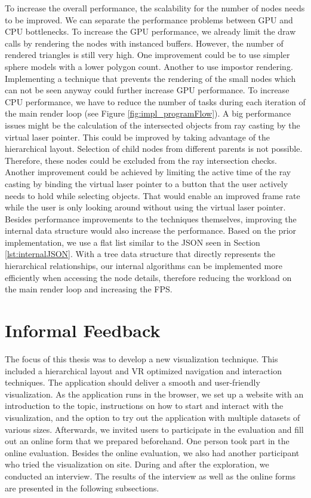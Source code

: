 To increase the overall performance, the scalability for the number of nodes needs to be improved. We can separate the performance problems between GPU and CPU bottlenecks.
To increase the GPU performance, we already limit the draw calls by rendering the nodes with instanced buffers.
However, the number of rendered triangles is still very high. 
One improvement could be to use simpler sphere models with a lower polygon count. Another to use impostor rendering. Implementing a technique that prevents the rendering of the small nodes which can not be seen anyway could further increase GPU performance.
To increase CPU performance, we have to reduce the number of tasks during each iteration of the main render loop (see Figure \ref{fig:impl_programFlow}).
A big performance issues might be the calculation of the intersected objects from ray casting by the virtual laser pointer. This could be improved by taking advantage of the hierarchical layout.
Selection of child nodes from different parents is not possible. Therefore, these nodes could be excluded from the ray intersection checks. 
Another improvement could be achieved by limiting the active time of the ray casting by binding the virtual laser pointer to a button that the user actively needs to hold while selecting objects. 
That would enable an improved frame rate while the user is only looking around without using the virtual laser pointer.
Besides performance improvements to the techniques themselves, improving the internal data structure would also increase the performance. Based on the prior implementation, we use a flat list similar to the JSON seen in Section \ref{lst:internalJSON}. With a tree data structure that directly represents the hierarchical relationships, our internal algorithms can be implemented more efficiently when accessing the node details, therefore reducing the workload on the main render loop and increasing the FPS.

\section{Informal Feedback}
\label{sec:informalFeedback}

The focus of this thesis was to develop a new visualization technique. This included a hierarchical layout and VR optimized navigation and interaction techniques.
The application should deliver a smooth and user-friendly visualization.
As the application runs in the browser, we set up a website \cite{thesisWebsite} with an introduction to the topic, instructions on how to start and interact with the visualization, and the option to try out the application with multiple datasets of various sizes. Afterwards, we invited users to participate in the evaluation and fill out an online form that we prepared beforehand. One person took part in the online evaluation. 
Besides the online evaluation, we also had another participant who tried the visualization on site. During and after the exploration, we conducted an interview.
The results of the interview as well as the online forms are presented in the following subsections.

